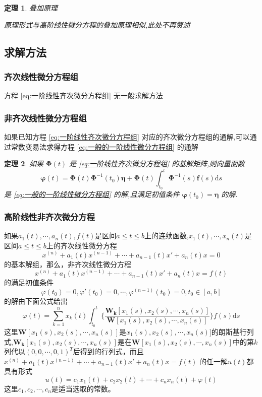 \documentclass{ctexart}
\newtheorem{theorem}{定理}[section]
\numberwithin{equation}{subsection}
\begin{document}
\begin{theorem}叠加原理
        
        原理形式与高阶线性微分方程的叠加原理相似,此处不再赘述
\end{theorem}

\subsection{求解方法}
\subsubsection{齐次线性微分方程组}
        方程 \eqref{eq:一阶线性齐次微分方程组} 无一般求解方法
\subsubsection{非齐次线性微分方程组}
        如果已知方程 \eqref{eq:一阶线性齐次微分方程组} 对应的齐次微分方程组的通解,可以通过常数变易法求得方程 \eqref{eq:一般的一阶线性微分方程组} 的通解
\begin{theorem}
        如果 $\boldsymbol{\Phi}(t)$ 是 \eqref{eq:一阶线性齐次微分方程组} 的基解矩阵,则向量函数
        \textcolor[rgb]{1,0,0}{
\begin{equation}
        \label{eq:常数变易公式二}
        \boldsymbol{\varphi}(t)=\boldsymbol{\Phi}(t)\boldsymbol{\Phi}^{-1}(t_0)\boldsymbol{\eta}+\boldsymbol{\Phi}(t) \int_{t_{0}}^{t} \boldsymbol{\Phi}^{-1}(s) \boldsymbol{f}(s) \mathrm{d} s
\end{equation} }
是 \eqref{eq:一般的一阶线性微分方程组} 的解,且满足初值条件 $\boldsymbol{\varphi}(t_0)=\boldsymbol{\eta}$ 的解.
        
\end{theorem}
\subsubsection{高阶线性非齐次微分方程}
如果$a_1(t),\cdots,a_n(t),f(t)$是区间$a \le t \le b$上的连续函数,$x_1(t),\cdots,x_n(t)$是区间$a \le t \le b$上的齐次线性微分方程 \[x^{(n)}+a_1(t)x^{(n-1)}+\cdots+a_{n-1}(t)x'+a_n(t)x=0 \]的基本解组，那么，非齐次线性微分方程\[x^{(n)}+a_1(t)x^{(n-1)}+\cdots+a_{n-1}(t)x'+a_n(t)x=f(t) \]的满足初值条件\[\varphi(t_0)=0,{\varphi}'(t_0)=0,\cdots,\varphi^{(n-1)}(t_0)=0,t_0 \in [a,b] \]的解由下面公式给出\begin{equation}
        \label{eq:常数变易公式三}
        \varphi(t)=\sum\limits_{k=1}^n x_k(t) \int_{t_0}^t \{ \frac{\boldsymbol{W_k}[x_1(s),x_2(s),\cdots,x_n(s) ] }{\boldsymbol{W}[x_1(s),x_2(s),\cdots,x_n(s) ]} \} f(s) \mathrm{d} s
\end{equation} 
这里$\boldsymbol{W}[x_1(s),x_2(s),\cdots,x_n(s) ] $是$x_1(s),x_2(s),\cdots,x_n(s) ]$的朗斯基行列式,$\boldsymbol{W_k}[x_1(s),x_2(s),\cdots,x_n(s) ] $是在$\boldsymbol{W}[x_1(s),x_2(s),\cdots,x_n(s) ] $中的第$k$列代以$(0,0,\cdots,0,1)^T$后得到的行列式，而且$x^{(n)}+a_1(t)x^{(n-1)}+\cdots+a_{n-1}(t)x'+a_n(t)x=f(t) $ 的任一解$u(t)$都具有形式 \[ u(t)=c_1x_1(t)+c_2x_2(t)+\cdots+c_nx_n(t)+\varphi(t) \]这里$c_1,c_2,\cdots,c_n$是适当选取的常数。
\end{document}
